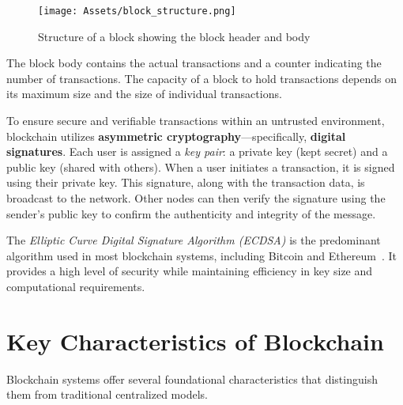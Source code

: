 \begin{figure}[H]
    \centering
    \texttt{[image: Assets/block\_structure.png]}
    \caption{Structure of a block showing the block header and body}
    \label{fig:block_structure}
\end{figure}

The block body contains the actual transactions and a counter indicating the number of transactions. The capacity of a block to hold transactions depends on its maximum size and the size of individual transactions.

To ensure secure and verifiable transactions within an untrusted environment, blockchain utilizes \textbf{asymmetric cryptography}—specifically, \textbf{digital signatures}. Each user is assigned a \textit{key pair}: a private key (kept secret) and a public key (shared with others). When a user initiates a transaction, it is signed using their private key. This signature, along with the transaction data, is broadcast to the network. Other nodes can then verify the signature using the sender’s public key to confirm the authenticity and integrity of the message.

The \textit{Elliptic Curve Digital Signature Algorithm (ECDSA)} is the predominant algorithm used in most blockchain systems, including Bitcoin and Ethereum~\cite{johnson2001ecdsa}. It provides a high level of security while maintaining efficiency in key size and computational requirements.
\section{Key Characteristics of Blockchain}

Blockchain systems offer several foundational characteristics that distinguish them from traditional centralized models.

